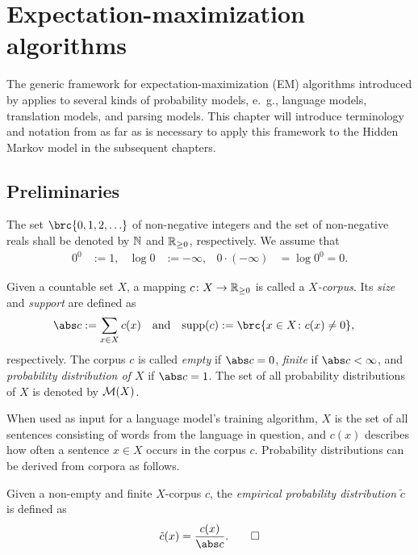\chapter{Expectation-maximization algorithms}

The generic framework for expectation-maximization (EM) algorithms introduced
by \cite{bucstuvog15} applies to several kinds of probability models, e.~g.,
language models, translation models, and parsing models.
This chapter will introduce terminology and notation from \cite{bucstuvog15} as
far as is necessary to apply this framework to the Hidden Markov model in the
subsequent chapters.

\section{Preliminaries}

The set $\brc{0,1,2,\ldots}$ of non-negative integers and the set of
non-negative reals shall be denoted by $\mathbb N$ and $\mathbb R_{\geq0}$, respectively.
We assume that
\begin{align*}
 0^0 &:= 1, &
 \log 0 &:= -\infty, &
 0 \cdot (-\infty) &= \log 0^0 = 0.
\end{align*}

\begin{definition}
 Given a countable set $X$, a mapping $c\colon X \to \mathbb R_{\geq0}$ is called a
 \emph{$X$-corpus}. Its \emph{size} and \emph{support} are defined as
 \begin{align*}
  \abs c &:= \sum_{x\in X} c(x) &
  \text{and} &&
  \operatorname{supp}(c) &:= \brc{x\in X\colon c(x)\neq0},
 \end{align*}
 respectively. The corpus $c$ is called \emph{empty} if $\abs c = 0$, \emph{finite} if
 $\abs c<\infty$, and \emph{probability distribution of $X$} if $\abs c = 1$.
 The set of all probability distributions of $X$ is denoted by $\mathcal M(X)$.
\end{definition}

When used as input for a language model's training algorithm, $X$ is the set of
all sentences consisting of words from the language in question, and $c(x)$
describes how often a sentence $x\in X$ occurs in the corpus $c$.
Probability distributions can be derived from corpora as follows.

\begin{definition}
 Given a non-empty and finite $X$-corpus $c$, the \emph{empirical probability
 distribution} $\tilde c$ is defined as
 \[
  \tilde c(x) = \frac{c(x)}{\abs c}.\qedhere
 \]
\end{definition}

